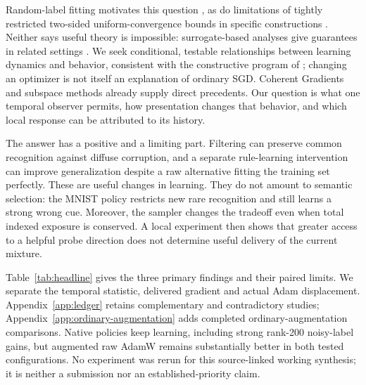 \documentclass[10pt]{article}
\begin{document}
Random-label fitting motivates this question \citep{zhang2017rethinking}, as do limitations of tightly restricted two-sided uniform-convergence bounds in specific constructions \citep{nagarajan2021uniform}. Neither says useful theory is impossible: surrogate-based analyses give guarantees in related settings \citep{negrea2020defense}. We seek conditional, testable relationships between learning dynamics and behavior, consistent with the constructive program of \citet{simon2026theory}; changing an optimizer is not itself an explanation of ordinary SGD. Coherent Gradients and subspace methods already supply direct precedents. Our question is what one temporal observer permits, how presentation changes that behavior, and which local response can be attributed to its history.

The answer has a positive and a limiting part. Filtering can preserve common recognition against diffuse corruption, and a separate rule-learning intervention can improve generalization despite a raw alternative fitting the training set perfectly. These are useful changes in learning. They do not amount to semantic selection: the MNIST policy restricts new rare recognition and still learns a strong wrong cue. Moreover, the sampler changes the tradeoff even when total indexed exposure is conserved. A local experiment then shows that greater access to a helpful probe direction does not determine useful delivery of the current mixture.

Table~\ref{tab:headline} gives the three primary findings and their paired limits. We separate the temporal statistic, delivered gradient and actual Adam displacement. Appendix~\ref{app:ledger} retains complementary and contradictory studies; Appendix~\ref{app:ordinary-augmentation} adds completed ordinary-augmentation comparisons. Native policies keep learning, including strong rank-200 noisy-label gains, but augmented raw AdamW remains substantially better in both tested configurations. No experiment was rerun for this source-linked working synthesis; it is neither a submission nor an established-priority claim.
\end{document}
